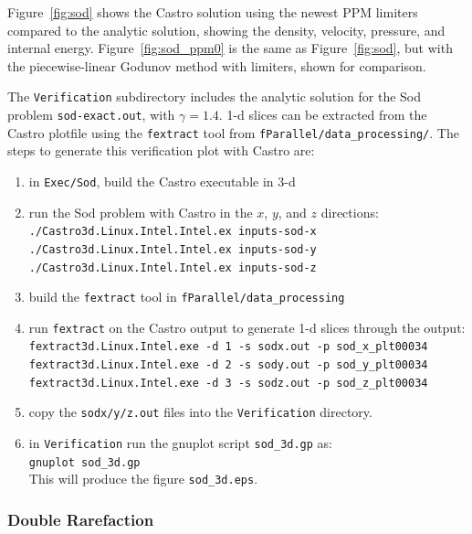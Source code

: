 Figure~\ref{fig:sod} shows the Castro solution using the newest PPM limiters
compared to the analytic 
solution, showing the density, velocity, pressure, and internal energy.
Figure~\ref{fig:sod_ppm0} is the same as Figure~\ref{fig:sod},
but with the piecewise-linear Godunov method with limiters, 
shown for comparison.

The {\tt Verification} subdirectory includes the analytic solution for
the Sod problem {\tt sod-exact.out}, with $\gamma = 1.4$.  1-d slices
can be extracted from the Castro plotfile using the {\tt fextract} tool
from {\tt fParallel/data\_processing/}.  The steps to
generate this verification plot with Castro are:
\begin{enumerate}
\item in {\tt Exec/Sod}, build the Castro executable in 3-d
\item run the Sod problem with Castro in the $x$, $y$, and $z$ directions: \\
 {\tt ./Castro3d.Linux.Intel.Intel.ex inputs-sod-x} \\
 {\tt ./Castro3d.Linux.Intel.Intel.ex inputs-sod-y} \\
 {\tt ./Castro3d.Linux.Intel.Intel.ex inputs-sod-z}
\item build the {\tt fextract} tool in {\tt fParallel/data\_processing}
\item run {\tt fextract} on the Castro output to generate 1-d slices
 through the output: \\
 {\tt fextract3d.Linux.Intel.exe -d 1 -s sodx.out -p sod\_x\_plt00034} \\
 {\tt fextract3d.Linux.Intel.exe -d 2 -s sody.out -p sod\_y\_plt00034} \\
 {\tt fextract3d.Linux.Intel.exe -d 3 -s sodz.out -p sod\_z\_plt00034}
\item copy the {\tt sodx/y/z.out} files into the {\tt Verification} directory.
\item in {\tt Verification} run the gnuplot script {\tt sod\_3d.gp} as: \\
 {\tt gnuplot sod\_3d.gp} \\
 This will produce the figure {\tt sod\_3d.eps}.
\end{enumerate}

\subsubsection{Double Rarefaction}

